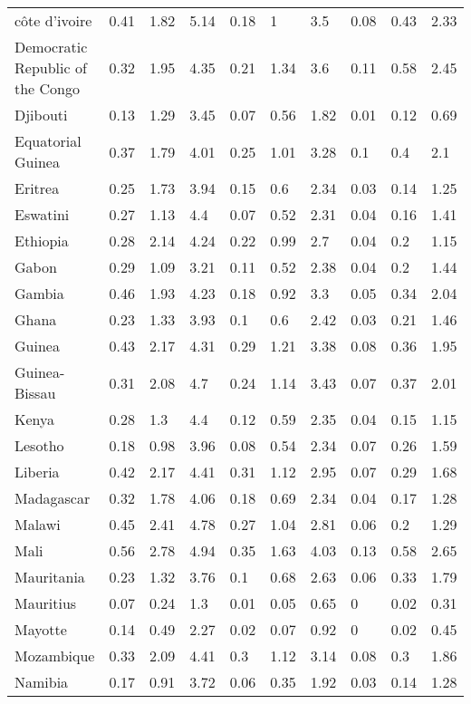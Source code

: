 \begin{longtable}[t]{llllllllll}
côte d'ivoire & 0.41 & 1.82 & 5.14 & 0.18 & 1 & 3.5 & 0.08 & 0.43 & 2.33\\
Democratic Republic of the Congo & 0.32 & 1.95 & 4.35 & 0.21 & 1.34 & 3.6 & 0.11 & 0.58 & 2.45\\
Djibouti & 0.13 & 1.29 & 3.45 & 0.07 & 0.56 & 1.82 & 0.01 & 0.12 & 0.69\\
Equatorial Guinea & 0.37 & 1.79 & 4.01 & 0.25 & 1.01 & 3.28 & 0.1 & 0.4 & 2.1\\
Eritrea & 0.25 & 1.73 & 3.94 & 0.15 & 0.6 & 2.34 & 0.03 & 0.14 & 1.25\\
Eswatini & 0.27 & 1.13 & 4.4 & 0.07 & 0.52 & 2.31 & 0.04 & 0.16 & 1.41\\
Ethiopia & 0.28 & 2.14 & 4.24 & 0.22 & 0.99 & 2.7 & 0.04 & 0.2 & 1.15\\
Gabon & 0.29 & 1.09 & 3.21 & 0.11 & 0.52 & 2.38 & 0.04 & 0.2 & 1.44\\
Gambia & 0.46 & 1.93 & 4.23 & 0.18 & 0.92 & 3.3 & 0.05 & 0.34 & 2.04\\
Ghana & 0.23 & 1.33 & 3.93 & 0.1 & 0.6 & 2.42 & 0.03 & 0.21 & 1.46\\
Guinea & 0.43 & 2.17 & 4.31 & 0.29 & 1.21 & 3.38 & 0.08 & 0.36 & 1.95\\
Guinea-Bissau & 0.31 & 2.08 & 4.7 & 0.24 & 1.14 & 3.43 & 0.07 & 0.37 & 2.01\\
Kenya & 0.28 & 1.3 & 4.4 & 0.12 & 0.59 & 2.35 & 0.04 & 0.15 & 1.15\\
Lesotho & 0.18 & 0.98 & 3.96 & 0.08 & 0.54 & 2.34 & 0.07 & 0.26 & 1.59\\
Liberia & 0.42 & 2.17 & 4.41 & 0.31 & 1.12 & 2.95 & 0.07 & 0.29 & 1.68\\
Madagascar & 0.32 & 1.78 & 4.06 & 0.18 & 0.69 & 2.34 & 0.04 & 0.17 & 1.28\\
Malawi & 0.45 & 2.41 & 4.78 & 0.27 & 1.04 & 2.81 & 0.06 & 0.2 & 1.29\\
Mali & 0.56 & 2.78 & 4.94 & 0.35 & 1.63 & 4.03 & 0.13 & 0.58 & 2.65\\
Mauritania & 0.23 & 1.32 & 3.76 & 0.1 & 0.68 & 2.63 & 0.06 & 0.33 & 1.79\\
Mauritius & 0.07 & 0.24 & 1.3 & 0.01 & 0.05 & 0.65 & 0 & 0.02 & 0.31\\
Mayotte & 0.14 & 0.49 & 2.27 & 0.02 & 0.07 & 0.92 & 0 & 0.02 & 0.45\\
Mozambique & 0.33 & 2.09 & 4.41 & 0.3 & 1.12 & 3.14 & 0.08 & 0.3 & 1.86\\
Namibia & 0.17 & 0.91 & 3.72 & 0.06 & 0.35 & 1.92 & 0.03 & 0.14 & 1.28\\

\end{longtable}
